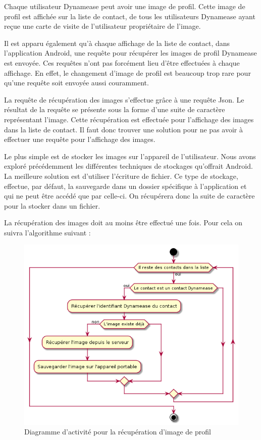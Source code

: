 Chaque utilisateur Dynamease peut avoir une image de profil. Cette image de profil est affichée sur la liste de contact, de tous les utilisateurs Dynamease ayant reçue une carte de visite de l'utilisateur propriétaire de l'image.

Il est apparu également qu'à chaque affichage de la liste de contact, dans l'application Android, une requête pour récupérer les images de profil Dynamease est envoyée. Ces requêtes n'ont pas forcément lieu d'être effectuées à chaque affichage. En effet, le changement d'image de profil est beaucoup trop rare pour qu'une requête soit envoyée aussi couramment.

La requête de récupération des images s'effectue grâce à une requête Json. Le résultat de la requête se présente sous la forme d'une suite de caractère représentant l'image. Cette récupération est effectuée pour l'affichage des images dans la liste de contact. Il faut donc trouver une solution pour ne pas avoir à effectuer une requête pour l'affichage des images.

Le plus simple est de stocker les images sur l'appareil de l'utilisateur. Nous avons exploré précédemment les différentes techniques de stockages qu'offrait Android. La meilleure solution est d'utiliser l'écriture de fichier. Ce type de stockage, effectue, par défaut, la sauvegarde dans un dossier spécifique à l'application et qui ne peut être accédé que par celle-ci. On récupérera donc la suite de caractère pour la stocker dans un fichier. 

La récupération des images doit au moins être effectué une fois. Pour cela on suivra l'algorithme suivant :

\begin{figure}[!h]
	\centering
	\includegraphics[scale=0.5]{img/activity_image.png}
	\caption{\label{activity_image} {Diagramme d'activité pour la récupération d'image de profil}}
\end{figure}

